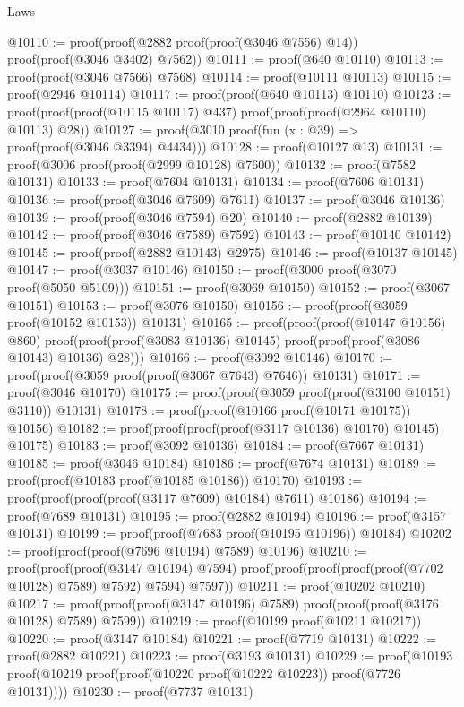 \begin{lexlean}{Laws}
\begin{coremodule}
@10110 := proof(proof(@2882 proof(proof(@3046 @7556) @14)) proof(proof(@3046 @3402) @7562))
@10111 := proof(@640 @10110)
@10113 := proof(proof(@3046 @7566) @7568)
@10114 := proof(@10111 @10113)
@10115 := proof(@2946 @10114)
@10117 := proof(proof(@640 @10113) @10110)
@10123 := proof(proof(proof(@10115 @10117) @437) proof(proof(proof(@2964 @10110) @10113) @28))
@10127 := proof(@3010 proof(fun (x : @39) => proof(proof(@3046 @3394) @4434)))
@10128 := proof(@10127 @13)
@10131 := proof(@3006 proof(proof(@2999 @10128) @7600))
@10132 := proof(@7582 @10131)
@10133 := proof(@7604 @10131)
@10134 := proof(@7606 @10131)
@10136 := proof(proof(@3046 @7609) @7611)
@10137 := proof(@3046 @10136)
@10139 := proof(proof(@3046 @7594) @20)
@10140 := proof(@2882 @10139)
@10142 := proof(proof(@3046 @7589) @7592)
@10143 := proof(@10140 @10142)
@10145 := proof(proof(@2882 @10143) @2975)
@10146 := proof(@10137 @10145)
@10147 := proof(@3037 @10146)
@10150 := proof(@3000 proof(@3070 proof(@5050 @5109)))
@10151 := proof(@3069 @10150)
@10152 := proof(@3067 @10151)
@10153 := proof(@3076 @10150)
@10156 := proof(proof(@3059 proof(@10152 @10153)) @10131)
@10165 := proof(proof(proof(@10147 @10156) @860)
      proof(proof(proof(@3083 @10136) @10145) proof(proof(proof(@3086 @10143) @10136) @28)))
@10166 := proof(@3092 @10146)
@10170 := proof(proof(@3059 proof(proof(@3067 @7643) @7646)) @10131)
@10171 := proof(@3046 @10170)
@10175 := proof(proof(@3059 proof(proof(@3100 @10151) @3110)) @10131)
@10178 := proof(proof(@10166 proof(@10171 @10175)) @10156)
@10182 := proof(proof(proof(proof(@3117 @10136) @10170) @10145) @10175)
@10183 := proof(@3092 @10136)
@10184 := proof(@7667 @10131)
@10185 := proof(@3046 @10184)
@10186 := proof(@7674 @10131)
@10189 := proof(proof(@10183 proof(@10185 @10186)) @10170)
@10193 := proof(proof(proof(proof(@3117 @7609) @10184) @7611) @10186)
@10194 := proof(@7689 @10131)
@10195 := proof(@2882 @10194)
@10196 := proof(@3157 @10131)
@10199 := proof(proof(@7683 proof(@10195 @10196)) @10184)
@10202 := proof(proof(proof(@7696 @10194) @7589) @10196)
@10210 := proof(proof(proof(@3147 @10194) @7594)
      proof(proof(proof(proof(proof(@7702 @10128) @7589) @7592) @7594) @7597))
@10211 := proof(@10202 @10210)
@10217 := proof(proof(proof(@3147 @10196) @7589) proof(proof(proof(@3176 @10128) @7589) @7599))
@10219 := proof(@10199 proof(@10211 @10217))
@10220 := proof(@3147 @10184)
@10221 := proof(@7719 @10131)
@10222 := proof(@2882 @10221)
@10223 := proof(@3193 @10131)
@10229 := proof(@10193 proof(@10219 proof(proof(@10220 proof(@10222 @10223)) proof(@7726 @10131))))
@10230 := proof(@7737 @10131)

\end{coremodule}
\end{lexlean}
